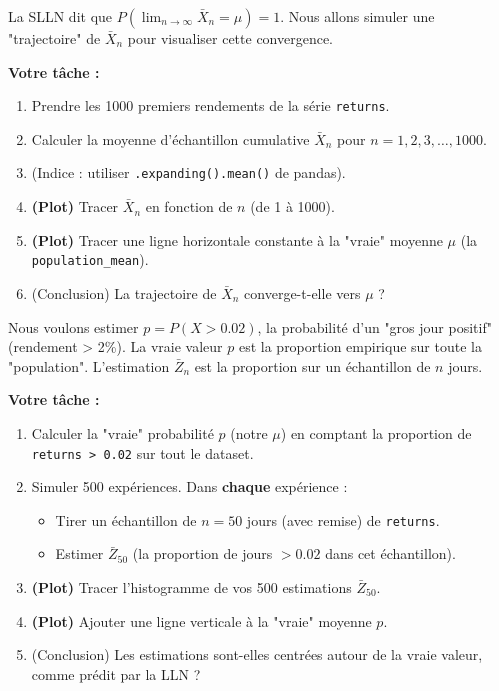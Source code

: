 \begin{exercicebox}
La SLLN dit que $P(\lim_{n \to \infty} \bar{X}_n = \mu) = 1$. Nous allons simuler une "trajectoire" de $\bar{X}_n$ pour visualiser cette convergence.

\textbf{Votre tâche :}
\begin{enumerate}
    \item Prendre les 1000 premiers rendements de la série \texttt{returns}.
    \item Calculer la moyenne d'échantillon cumulative $\bar{X}_n$ pour $n=1, 2, 3, \dots, 1000$.
    \item (Indice : utiliser \texttt{.expanding().mean()} de pandas).
    \item \textbf{(Plot)} Tracer $\bar{X}_n$ en fonction de $n$ (de 1 à 1000).
    \item \textbf{(Plot)} Tracer une ligne horizontale constante à la "vraie" moyenne $\mu$ (la \texttt{population\_mean}).
    \item (Conclusion) La trajectoire de $\bar{X}_n$ converge-t-elle vers $\mu$ ?
\end{enumerate}
\end{exercicebox}

\begin{exercicebox}
Nous voulons estimer $p = P(X > 0.02)$, la probabilité d'un "gros jour positif" (rendement > 2\%).
La vraie valeur $p$ est la proportion empirique sur toute la "population".
L'estimation $\bar{Z}_n$ est la proportion sur un échantillon de $n$ jours.

\textbf{Votre tâche :}
\begin{enumerate}
    \item Calculer la "vraie" probabilité $p$ (notre $\mu$) en comptant la proportion de \texttt{returns > 0.02} sur tout le dataset.
    \item Simuler 500 expériences. Dans \textbf{chaque} expérience :
        \begin{itemize}
            \item Tirer un échantillon de $n=50$ jours (avec remise) de \texttt{returns}.
            \item Estimer $\bar{Z}_{50}$ (la proportion de jours $> 0.02$ dans cet échantillon).
        \end{itemize}
    \item \textbf{(Plot)} Tracer l'histogramme de vos 500 estimations $\bar{Z}_{50}$.
    \item \textbf{(Plot)} Ajouter une ligne verticale à la "vraie" moyenne $p$.
    \item (Conclusion) Les estimations sont-elles centrées autour de la vraie valeur, comme prédit par la LLN ?
\end{enumerate}
\end{exercicebox}


